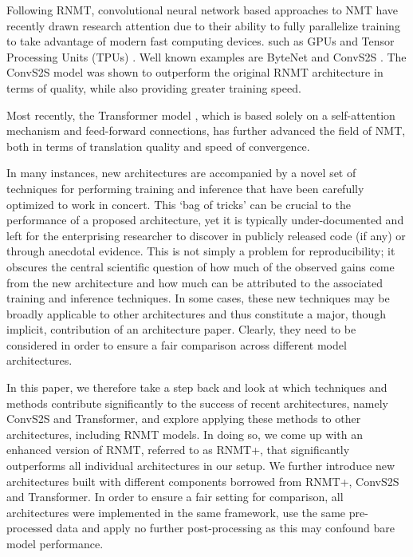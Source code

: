 \documentclass[11pt,a4paper]{article}
\begin{document}
Following RNMT, convolutional neural network based approaches
\cite{LeCun:1998:CNI:303568.303704} to NMT have recently drawn research
attention due to their ability to
fully parallelize training to take advantage of modern fast computing devices.
such as GPUs and Tensor Processing Units (TPUs) \cite{DBLP:journals/corr/JouppiYPPABBBBB17}.
Well known examples are ByteNet
\cite{DBLP:journals/corr/KalchbrennerESO16} and ConvS2S
\cite{DBLP:journals/corr/GehringAGYD17}.
The ConvS2S model was shown to outperform the original RNMT architecture in terms
of quality, while also providing greater training speed.

Most recently, the Transformer model
\cite{DBLP:journals/corr/VaswaniSPUJGKP17}, which is based solely on
a self-attention mechanism \cite{Parikh2016ADA} and feed-forward connections, has further advanced
the field of NMT, both in terms of translation quality and speed of convergence.



In many instances, new architectures are accompanied by a novel set of
techniques for performing training and inference that have been carefully
optimized to work in concert. This `bag of tricks' can be crucial to the
performance of a proposed architecture, yet it is typically under-documented and
left for the enterprising researcher to discover in publicly released code (if
any) or through anecdotal evidence. This is not simply a problem for
reproducibility; it obscures the central scientific question of how much of the
observed gains come from the new architecture and how much can be
attributed to the associated training and inference techniques. In
some cases, these new techniques may be broadly applicable to other
architectures and thus constitute a major, though implicit, contribution
of an architecture paper. Clearly, they need to be considered in order
to ensure a fair comparison across different model architectures.

In this paper, we therefore take a step back and look at which
techniques and methods contribute
significantly to the success of recent architectures, namely ConvS2S and
Transformer, and explore applying
these methods to other architectures, including RNMT models.
In doing so, we come up with an enhanced version of RNMT, referred to as RNMT+,
that significantly outperforms all individual architectures in our setup.
We further introduce new
architectures built with different components borrowed from
RNMT+, ConvS2S and Transformer.
In order to ensure a fair setting for comparison, all architectures
were implemented in the same framework, use the same
pre-processed data and apply no further post-processing as this may
confound bare model performance.
\end{document}
